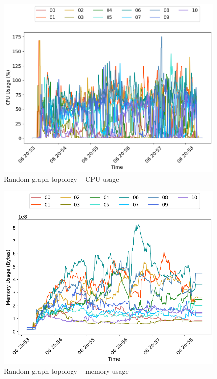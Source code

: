 \begin{minipage}{0.5\linewidth}
\begin{figure}[H]
\captionsetup{justification=centering,width=0.8\linewidth}
\includegraphics[width=\linewidth]{figures/graph-random/cpu_usage.png}
\caption{Random graph topology -- CPU usage}
\label{fig:graph-random-blk_read}
\end{figure}
\end{minipage}
\begin{minipage}{0.5\linewidth}
\begin{figure}[H]
\captionsetup{justification=centering,width=0.8\linewidth}
\includegraphics[width=\linewidth]{figures/graph-random/mem_usage.png}
\caption{Random graph topology -- memory usage}
\label{fig:graph-random-blk_write}
\end{figure}
\end{minipage}

